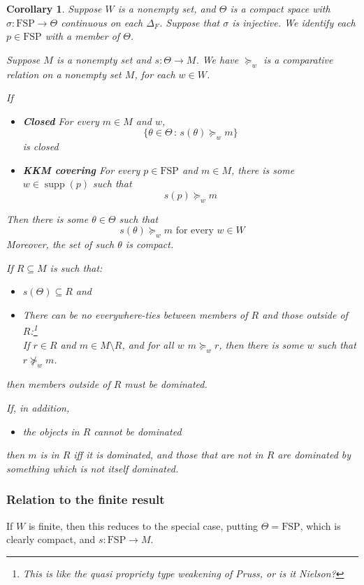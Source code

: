 \documentclass[11pt]{article}
\newtheorem{corollary}[theorem]{Corollary}
\theoremstyle{definition}
\theoremstyle{remark}
\newcommand{\supp}{\operatorname{supp}}
\newcommand{\given}{\,:\,}
\newcommand{\FSP}{\mathrm{FSP}}
\begin{document}
\begin{corollary}
	Suppose $W$ is a nonempty set, and $\Theta$ is a compact space with $\sigma:\FSP\to \Theta$ continuous on each $\Delta_F$. Suppose that $\sigma$ is injective. We identify each $p\in \FSP$ with a member of $\Theta$. 
	
	Suppose $M$ is a nonempty set and $s:\Theta\to M$. We have $\succeq_w$ is a comparative relation on a nonempty set $M$, for each $w\in W$. 
	
	If \begin{itemize}
		\item \textbf{Closed} For every $m\in M$ and $w$, \[\{\theta\in\Theta\given s(\theta)\succeq_w m\}\] is closed
		\item \textbf{KKM covering} For every $p\in \FSP$ and $m\in M$, there is some $w\in\supp(p)$ such that $$s(p)\succeq_w m$$
	\end{itemize}
	Then there is some $\theta\in\Theta$ such that 
	\[
	s(\theta)\succeq_w m
	\text{ for every }w\in W
	\] 
	Moreover, the set of such $\theta$ is compact.
	
	If $R\subseteq M$ is such that:
	\begin{itemize}
		\item $s(\Theta)\subseteq R$ and
		\item There can be no everywhere-ties between members of $R$ and those outside of $R$:\footnote{This is like the quasi propriety type weakening of Pruss, or is it Nielson?} \\
		If $r\in R$ and $m\in M\setminus R$, and for all $w$ $m\succeq_w r$, then there is some $w$ such that $r\not\succeq_w m$.
	\end{itemize}then members outside of $R$ must be dominated. 
	
	If, in addition, \begin{itemize}
		\item the objects in $R$ cannot be dominated
	\end{itemize} then $m$ is in $R$ iff it is dominated, and those that are not in $R$ are dominated by something which is not itself dominated. 
\end{corollary}

\subsubsection{Relation to the finite result}

If $W$ is finite, then this reduces to the special case, putting $\Theta=\FSP$, which is clearly compact, and $s:\FSP\to M$.
\end{document}

